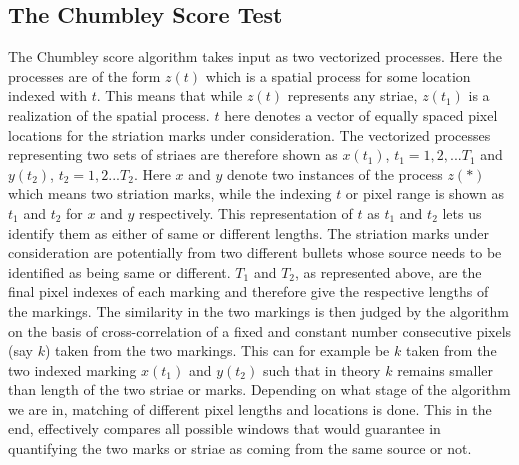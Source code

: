 \documentclass[12pt]{article}
\begin{document}
\subsection{The Chumbley Score Test}\label{the-chumbley-score-test}

The Chumbley score algorithm takes input as two vectorized processes.
Here the processes are of the form \(z(t)\) which is a spatial process
for some location indexed with \(t\). This means that while \(z(t)\)
represents any striae, \(z(t_1)\) is a realization of the spatial
process. \(t\) here denotes a vector of equally spaced pixel locations
for the striation marks under consideration. The vectorized processes
representing two sets of striaes are therefore shown as \(x(t_1)\),
\(t_1 = 1,2,...T_1\) and \(y(t_2)\), \(t_2 = 1,2...T_2\). Here \(x\) and
\(y\) denote two instances of the process \(z(*)\) which means two
striation marks, while the indexing \(t\) or pixel range is shown as
\(t_1\) and \(t_2\) for \(x\) and \(y\) respectively. This
representation of \(t\) as \(t_1\) and \(t_2\) lets us identify them as
either of same or different lengths. The striation marks under
consideration are potentially from two different bullets whose source
needs to be identified as being same or different. \(T_1\) and \(T_2\),
as represented above, are the final pixel indexes of each marking and
therefore give the respective lengths of the markings. The similarity in
the two markings is then judged by the algorithm on the basis of
cross-correlation of a fixed and constant number consecutive pixels (say
\(k\)) taken from the two markings. This can for example be \(k\) taken
from the two indexed marking \(x(t_1)\) and \(y(t_2)\) such that in
theory \(k\) remains smaller than length of the two striae or marks.
Depending on what stage of the algorithm we are in, matching of
different pixel lengths and locations is done. This in the end,
effectively compares all possible windows that would guarantee in
quantifying the two marks or striae as coming from the same source or
not.
\end{document}
